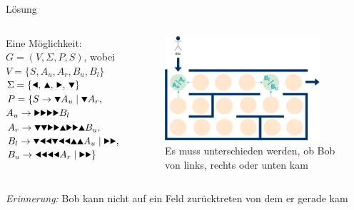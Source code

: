 {
\begin{frame}{Lösung}
    \begin{columns}
    \begin{alertblock}{Eine Möglichkeit:}
         $G = (V, \Sigma, P, S)$, wobei \\
         $V = \{S, A_u, A_r, B_u, B_l\}$ \\
         $\Sigma = \{\text{\Rewind, \MoveUp, \Forward, \MoveDown}\}$ \\
         $P = \{S \rightarrow \text\MoveDown A_u \mid \text\MoveDown A_r,$\\
         \qquad\; $A_u \rightarrow \text{\Forward\Forward\Forward\Forward} B_l$\\
         \qquad\; $A_r \rightarrow \text{\MoveDown\MoveDown\Forward\Forward\MoveUp\Forward\Forward\MoveUp} B_u,$\\
         \qquad\; $B_l \rightarrow \text{\MoveDown\Rewind\Rewind\MoveDown\Rewind\Rewind\MoveUp\MoveUp} A_u \mid \text{\Forward\Forward},$\\
         \qquad\; $B_u \rightarrow \text{\Rewind\Rewind\Rewind\Rewind} A_r \mid \text{\Forward\Forward}\}$
    \end{alertblock}
    \begin{figure}
        \centering
        \includegraphics[width=0.9\textwidth]{figures/GBeispielHowTo.png}
        \caption{Es muss unterschieden werden, ob Bob von links, rechts oder unten kam}
        
    \end{figure}
    \end{columns}
    \small\emph{Erinnerung:} Bob kann nicht auf ein Feld zurücktreten von dem er gerade kam
\end{frame}
} 

